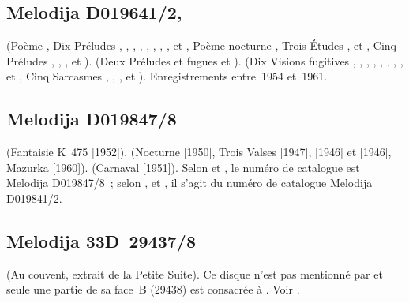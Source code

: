 \subsection{Melodija D019641/2, }

\Scriabine{} (Poème , Dix Préludes  , 
,  ,  , 
,  ,  , 
,   et  , Poème-nocturne
, Trois Études  ,   et
 , Cinq Préludes  , 
,  ,   et 
).
\Chostakovitch{} (Deux Préludes et fugues   et 
).
\Prokofiev{} (Dix Visions fugitives  , 
,  ,  , 
,  ,  , 
,   et  , Cinq Sarcasmes
 ,  ,  , 
 et  ).
Enregistrements entre~1954 et~1961.

\subsection{Melodija D019847/8}

\Mozart{} (Fantaisie K~475 [1952]).
\Chopin{} (Nocturne   [1950], Trois Valses 
 [1947],   [1946] et  
[1946], Mazurka   [1960]).
\Schumann{} (Carnaval  [1951]).
Selon \citet{Malik} et \citet{Masuda}, le numéro de catalogue est Melodija
D019847/8~; selon \citet{Nikonovich11}, \citet{Rossi} et \citet{White}, il
s'agit du numéro de catalogue Melodija D019841/2.

\subsection{Melodija 33D~29437/8}

\Borodine{} (Au couvent, extrait de la Petite Suite).
Ce disque n'est pas mentionné par \INikonovich{}
\citep[voir][]{Nikonovich11} et seule une partie de sa face~B (29438) est
consacrée à \VSofronitsky{}.
Voir \citet{Recordssu}.

